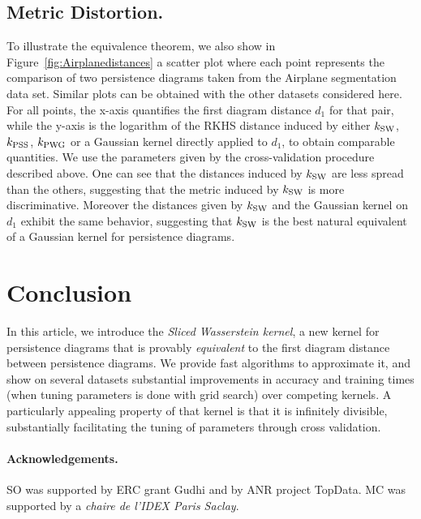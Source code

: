 \documentclass[11pt]{article}
\newcommand{\kPSS}{k_{\rm PSS}}
\newcommand{\kPWG}{k_{\rm PWG}}
\newcommand{\kSW}{k_{\rm SW}}
\begin{document}
\subsection{Metric Distortion.} 

To illustrate the equivalence theorem, we also show in Figure~\ref{fig:Airplanedistances} 
a scatter plot where each point represents the comparison of two persistence diagrams taken from the Airplane segmentation data set. 
Similar plots can be obtained with the other datasets considered here.
For all points, the x-axis quantifies the first diagram distance $d_1$ for that pair,
while the y-axis is the logarithm of the RKHS distance induced by either $\kSW$, $\kPSS$, $\kPWG$ 
or a Gaussian kernel directly applied to $d_1$, to obtain comparable quantities. 
We use the parameters given by the cross-validation procedure described above.
One can see that the distances induced by $\kSW$ are less spread than the others,
suggesting that the metric induced by $\kSW$ is more discriminative.
Moreover the distances given by $\kSW$ and the Gaussian kernel on $d_1$ exhibit the same behavior, 
suggesting that $\kSW$ is the best natural equivalent of a Gaussian kernel for persistence diagrams. 



\section{Conclusion}

In this article, we introduce the {\em Sliced Wasserstein kernel},
a new kernel for persistence diagrams that is provably {\em equivalent} to the first
diagram distance between persistence diagrams. We provide fast algorithms to approximate it,
and show on several datasets substantial improvements in accuracy and training times 
(when tuning parameters is done with grid search) over competing kernels. 
A particularly appealing property of that kernel is that it is infinitely divisible, 
substantially facilitating the tuning of parameters through cross validation.

\paragraph{Acknowledgements.}
SO was supported by ERC grant Gudhi and by ANR project TopData. 
MC was supported by a {\em chaire de l'IDEX Paris Saclay}.



\end{document}
